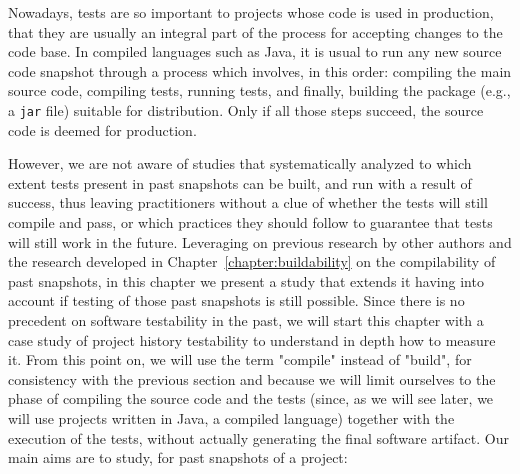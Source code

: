 Nowadays, tests are so important to projects whose code is used in production, that they are usually an integral part of the process for accepting changes to the code base. 
In compiled languages such as Java, it is usual to run any new source code snapshot through a process which involves, in this order: compiling the main source code, compiling tests, running tests, and finally, building the package (e.g., a \texttt{jar} file) suitable for distribution. 
Only if all those steps succeed, the source code is deemed for production.



However, we are not aware of studies that systematically analyzed to which extent tests present in past snapshots can be built, and run with a result of success, thus leaving practitioners without a clue of whether the tests will still compile and pass, or which practices they should follow to guarantee that tests will still work in the future.
Leveraging on previous research by other authors and the research developed in Chapter~\ref{chapter:buildability} on the compilability of past snapshots, in this chapter we present a study that extends it having into account if testing of those past snapshots is still possible. 
Since there is no precedent on software testability in the past, we will start this chapter with a case study of project history testability to understand in depth how to measure it.
From this point on, we will use the term "compile" instead of "build", for consistency with the previous section and because we will limit ourselves to the phase of compiling the source code and the tests (since, as we will see later, we will use projects written in Java, a compiled language) together with the execution of the tests, without actually generating the final software artifact.
Our main aims are to study, for past snapshots of a project:


